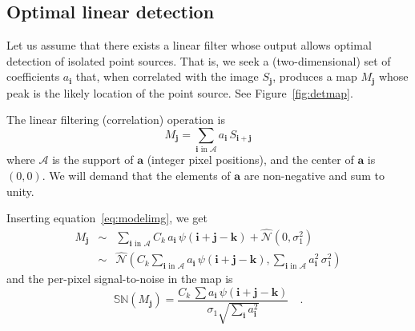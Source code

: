 \documentclass[letterpaper,preprint]{aastex}
\newcommand{\equationname}{equation}
\newcommand{\eqnref}[1]{\mbox{\equationname~\ref{#1}}}
\newcommand{\fig}{Figure}
\newcommand{\figref}[1]{\mbox{\fig~\ref{#1}}}
\newcommand{\drawnfrom}{\sim}
\newcommand{\gaussianN}{\mathcal{N}}
\newcommand{\gaussx}[1]{\hat{\gaussianN}\!\left(#1\right)}
\newcommand{\signoise}{[S/N]}
\newcommand{\snr}[1]{\mathbb{SN}(#1)}
\renewcommand{\vec}[1]{\boldsymbol{#1}}
\newcommand{\avec}{\vec{a}}
\newcommand{\ivec}{\vec{i}}
\newcommand{\jvec}{\vec{j}}
\newcommand{\kvec}{\vec{k}}
\newcommand{\coord}[2]{(#1, #2)}
\newcommand{\iina}{\ivec \,\, \mathrm{in} \,\, \mathcal{A}}
\begin{document}
\subsection{Optimal linear detection}
\label{app:lindet}

Let us assume that there exists a linear filter whose output allows
optimal detection of isolated point sources.  That is, we seek a
(two-dimensional) set of coefficients $a_{\ivec}$ that, when
correlated with the image $S_{\jvec}$, produces a map $M_{\jvec}$
whose peak is the likely location of the point source.  See
\figref{fig:detmap}.


The linear filtering (correlation) operation is
\begin{equation}
M_{\jvec} = \sum_{\iina} a_{\ivec} \, S_{\ivec + \jvec}
\label{eq:detmap1}
\end{equation}
where $\mathcal{A}$ is the support of $\avec$ (integer pixel
positions), and the center of $\avec$ is $\coord{0}{0}$.  We will
demand that the elements of $\avec$ are non-negative and sum to unity.

Inserting \eqnref{eq:modelimg}, we get
\begin{eqnarray}
M_{\jvec} &\drawnfrom& \sum_{\iina}
  C_k \, a_{\ivec} \, \psi(\ivec + \jvec - \kvec) + \gaussx{0, \sigma_1^2}
  \\
&\drawnfrom& \gaussx{ C_k \sum_{\iina} a_{\ivec} \, \psi(\ivec + \jvec - \kvec),
    \sum_{\iina} a_{\ivec}^2 \, \sigma_1^2}
\end{eqnarray}
and the per-pixel signal-to-noise in the map is
\begin{equation}
  \snr{M_{\jvec}} = \frac{C_k \, \sum a_{\ivec} \, \psi(\ivec + \jvec - \kvec)}{\sigma_1 \sqrt{\sum_{\ivec} a_{\ivec}^2}} \quad .
  \label{eq:detmapsn1}
\end{equation}
\end{document}
